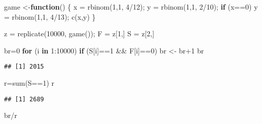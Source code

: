 \documentclass[
]{article}
\newenvironment{Shaded}{\begin{snugshade}}{\end{snugshade}}
\newcommand{\ControlFlowTok}[1]{\textcolor[rgb]{0.13,0.29,0.53}{\textbf{#1}}}
\newcommand{\DecValTok}[1]{\textcolor[rgb]{0.00,0.00,0.81}{#1}}
\newcommand{\FunctionTok}[1]{\textcolor[rgb]{0.00,0.00,0.00}{#1}}
\newcommand{\NormalTok}[1]{#1}
\newcommand{\OtherTok}[1]{\textcolor[rgb]{0.56,0.35,0.01}{#1}}
\newcommand{\SpecialCharTok}[1]{\textcolor[rgb]{0.00,0.00,0.00}{#1}}
\theoremstyle{definition}
\theoremstyle{definition}
\theoremstyle{definition}
\theoremstyle{remark}
\begin{document}
\begin{Shaded}
\begin{Highlighting}[]
\NormalTok{game }\OtherTok{\textless{}{-}}\ControlFlowTok{function}\NormalTok{() \{}
\NormalTok{x }\OtherTok{=} \FunctionTok{rbinom}\NormalTok{(}\DecValTok{1}\NormalTok{,}\DecValTok{1}\NormalTok{, }\DecValTok{4}\SpecialCharTok{/}\DecValTok{12}\NormalTok{);}
\NormalTok{y }\OtherTok{=} \FunctionTok{rbinom}\NormalTok{(}\DecValTok{1}\NormalTok{,}\DecValTok{1}\NormalTok{, }\DecValTok{2}\SpecialCharTok{/}\DecValTok{10}\NormalTok{);}
\ControlFlowTok{if}\NormalTok{ (x}\SpecialCharTok{==}\DecValTok{0}\NormalTok{)}
\NormalTok{y }\OtherTok{=} \FunctionTok{rbinom}\NormalTok{(}\DecValTok{1}\NormalTok{,}\DecValTok{1}\NormalTok{, }\DecValTok{4}\SpecialCharTok{/}\DecValTok{13}\NormalTok{);}
\FunctionTok{c}\NormalTok{(x,y)}
\NormalTok{\}}

\NormalTok{z }\OtherTok{=} \FunctionTok{replicate}\NormalTok{(}\DecValTok{10000}\NormalTok{, }\FunctionTok{game}\NormalTok{());}
\NormalTok{F }\OtherTok{=}\NormalTok{ z[}\DecValTok{1}\NormalTok{,]}
\NormalTok{S }\OtherTok{=}\NormalTok{ z[}\DecValTok{2}\NormalTok{,]}

\NormalTok{br}\OtherTok{=}\DecValTok{0}
\ControlFlowTok{for}\NormalTok{ (i }\ControlFlowTok{in} \DecValTok{1}\SpecialCharTok{:}\DecValTok{10000}\NormalTok{)}
\ControlFlowTok{if}\NormalTok{ (S[i]}\SpecialCharTok{==}\DecValTok{1} \SpecialCharTok{\&\&}\NormalTok{ F[i]}\SpecialCharTok{==}\DecValTok{0}\NormalTok{)}
\NormalTok{br }\OtherTok{\textless{}{-}}\NormalTok{ br}\SpecialCharTok{+}\DecValTok{1}
\NormalTok{br}
\end{Highlighting}
\end{Shaded}

\begin{verbatim}
## [1] 2015
\end{verbatim}

\begin{Shaded}
\begin{Highlighting}[]
\NormalTok{r}\OtherTok{=}\FunctionTok{sum}\NormalTok{(S}\SpecialCharTok{==}\DecValTok{1}\NormalTok{)}
\NormalTok{r}
\end{Highlighting}
\end{Shaded}

\begin{verbatim}
## [1] 2689
\end{verbatim}

\begin{Shaded}
\begin{Highlighting}[]
\NormalTok{br}\SpecialCharTok{/}\NormalTok{r}
\end{Highlighting}
\end{Shaded}
\end{document}
